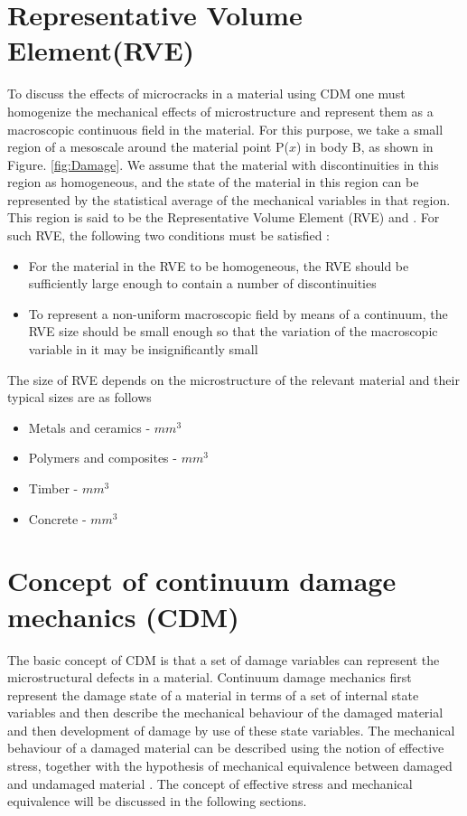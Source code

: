 \documentclass[12pt,a4paper,twoside,openright]{report}
\begin{document}
\section{Representative Volume Element(RVE)}
\indent\indent\indent  To discuss the effects of microcracks in a material using CDM one must homogenize the mechanical effects of microstructure and represent them as a macroscopic continuous field in the material. For this purpose, we take a small region of a mesoscale around the material point P($x$) in body B, as shown in Figure. \ref{fig:Damage}. We assume that the material with discontinuities in this region as homogeneous, and the state of the material in this region can be represented by the statistical average of the mechanical variables in that region. This region is said to be the Representative Volume Element (RVE) \citep{hill1963elastic} and \citep{hashin1983analysis}. For such RVE, the following two conditions must be satisfied \citep{murakami2012continuum}:
\begin{itemize}
\item  For the material in the RVE to be homogeneous, the RVE should be sufficiently large enough to contain a number of discontinuities
\item To represent a non-uniform macroscopic field by means of a continuum, the RVE size should be small enough so that the variation of the macroscopic variable in it may be insignificantly small 
\end{itemize}
The size of RVE depends on the microstructure of the relevant material and their typical sizes are as follows \citep{lemaitre2012course}
\begin{itemize}
\item Metals and ceramics  \;    -    \;$mm^3$
\item Polymers and composites \;   -   \;$mm^3$
\item Timber\; - \;$mm^3$
\item Concrete \; - \;$mm^3$
\end{itemize}

\section{Concept of continuum damage mechanics (CDM)}
\indent\indent\indent The basic concept of CDM is that a set of damage variables can represent the microstructural defects in a material. Continuum damage mechanics first represent the damage state of a material in terms of a set of internal state variables and then describe the mechanical behaviour of the damaged material and then development of damage by use of these state variables. The mechanical behaviour of a damaged material can be described using the notion of effective stress, together with the hypothesis of mechanical equivalence between damaged and undamaged material \citep{murakami2012continuum}. The concept of effective stress and mechanical equivalence will be discussed in the following sections.
\end{document}
